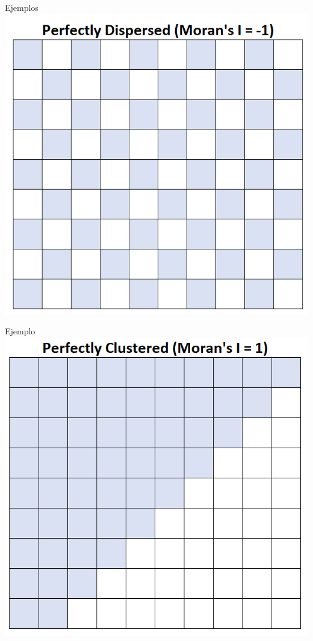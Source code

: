 \documentclass[
  11pt,
  ignorenonframetext,
]{beamer}
\begin{document}
\begin{frame}{Ejemplos}
\protect\hypertarget{ejemplos-1}{}
\includegraphics{Asociacion-imagenes/morani2.png}
\end{frame}

\begin{frame}{Ejemplo}
\protect\hypertarget{ejemplo}{}
\includegraphics{Asociacion-imagenes/morani3.png}
\end{frame}
\end{document}
